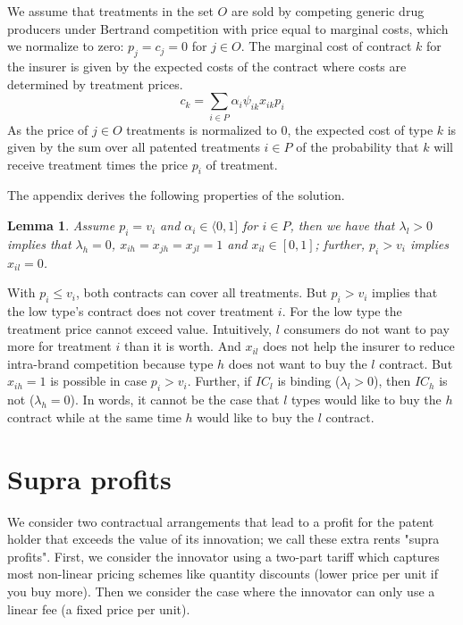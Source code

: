 \documentclass[a4paper,12pt]{article}
\newtheorem{lemma}{Lemma}
\begin{document}
We assume that treatments in the set \(O\) are sold by competing generic drug producers under Bertrand competition with price equal to marginal costs, which we normalize to zero: \(p_j = c_j =0\) for \(j \in O\). The marginal cost of contract \(k\) for the insurer is given by the expected costs of the contract where costs are determined by treatment prices.
\begin{equation}
\label{eq:14}
c_k = \sum_{i \in P} \alpha_i \psi_{ik} x_{ik} p_i
\end{equation}
As the price of \(j \in O\) treatments is normalized to 0, the expected cost of type \(k\) is given by the sum over all patented treatments \(i \in P\) of the probability that \(k\) will receive treatment times the price \(p_i\) of treatment.

The appendix derives the following properties of the solution.
\begin{lemma}
\label{Baseline_results}
Assume \(p_i = v_i\) and \(\alpha_i \in \langle 0,1]\) for \(i \in P\), then we have that \(\lambda_{l}>0\) implies that \(\lambda_h=0\), \(x_{ih}=x_{jh}=x_{jl}=1\) and \(x_{il} \in [0,1]\); further, \(p_i >v_i\) implies \(x_{il} =0\).
\end{lemma}

With \(p_i \leq v_i\), both contracts can cover all treatments. But \(p_i > v_i\) implies that the low type's contract does not cover treatment \(i\). For the low type the treatment price cannot exceed value. Intuitively, \(l\) consumers do not want to pay more for treatment \(i\) than it is worth. And \(x_{il}\) does not help the insurer to reduce intra-brand competition because type \(h\) does not want to buy the \(l\) contract. But \(x_{ih}=1\) is possible in case \(p_i > v_i\). Further, if \(IC_{l}\) is binding (\(\lambda_{l} > 0\)), then \(IC_{h}\) is not (\(\lambda_{h} =0\)). In words, it cannot be the case that \(l\) types would like to buy the \(h\) contract while at the same time \(h\) would like to buy the \(l\) contract.

\section{Supra profits}
\label{sec:org7d0b066}

We consider two contractual arrangements that lead to a profit for the patent holder that exceeds the value of its innovation; we call these extra rents "supra profits". First, we consider the innovator using a two-part tariff which captures most non-linear pricing schemes like quantity discounts (lower price per unit if you buy more). Then we consider the case where the innovator can only use a linear fee (a fixed price per unit).
\end{document}
